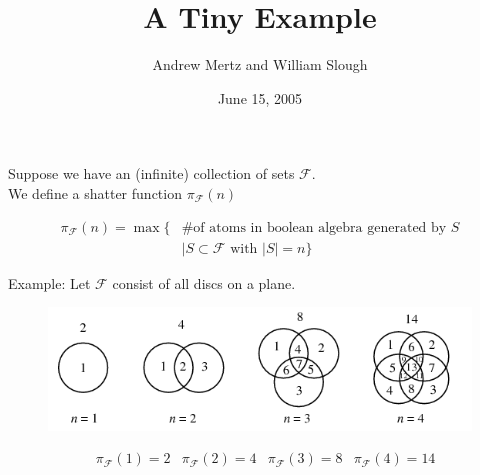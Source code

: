 \documentclass{beamer}
\title{A Tiny Example}
\author{Andrew Mertz and William Slough}
\date{June 15, 2005}
\newcommand{\F}{\mathcal F}
\begin{document}
\maketitle

\begin{frame}
	Suppose we have an (infinite) collection of sets $\F$. \\
	We define a shatter function $\pi_\F(n)$

	\begin{align*}
		\pi_\F(n) = \max \{ &\text {\# of atoms in boolean algebra generated by $S$} \\
		            &\mid S \subset \F \text{ with } |S| = n\}
	\end{align*}
\end{frame}

\begin{frame}
	Example: Let $\F$ consist of all discs on a plane.
	\begin{figure}[p]
    \centering
    \includegraphics[scale=0.75]{circle.png}
	\end{figure}
	\begin{align*}
		&\pi_\F(1) = 2 &\pi_\F(2) = 4 &\pi_\F(3) = 8 &\pi_\F(4) = 14 
	\end{align*}
\end{frame}
\end{document}

